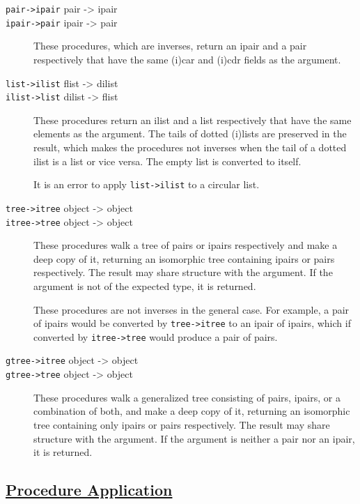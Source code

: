 \begin{description}
\item[ \href{}{} \texttt{pair-\textgreater{}ipair} pair -\textgreater{}
ipair\\
\href{}{} \texttt{ipair-\textgreater{}pair} ipair -\textgreater{} pair ]
These procedures, which are inverses, return an ipair and a pair
respectively that have the same (i)car and (i)cdr fields as the
argument.
\item[ \href{}{} \texttt{list-\textgreater{}ilist} flist -\textgreater{}
dilist\\
\href{}{} \texttt{ilist-\textgreater{}list} dilist -\textgreater{} flist
]
These procedures return an ilist and a list respectively that have the
same elements as the argument. The tails of dotted (i)lists are
preserved in the result, which makes the procedures not inverses when
the tail of a dotted ilist is a list or vice versa. The empty list is
converted to itself.

It is an error to apply \texttt{list-\textgreater{}ilist} to a circular
list.
\item[ \href{}{} \texttt{tree-\textgreater{}itree} object
-\textgreater{} object\\
\href{}{} \texttt{itree-\textgreater{}tree} object -\textgreater{}
object ]
These procedures walk a tree of pairs or ipairs respectively and make a
deep copy of it, returning an isomorphic tree containing ipairs or pairs
respectively. The result may share structure with the argument. If the
argument is not of the expected type, it is returned.

These procedures are not inverses in the general case. For example, a
pair of ipairs would be converted by \texttt{tree-\textgreater{}itree}
to an ipair of ipairs, which if converted by
\texttt{itree-\textgreater{}tree} would produce a pair of pairs.
\item[ \href{}{} \texttt{gtree-\textgreater{}itree} object
-\textgreater{} object\\
\href{}{} \texttt{gtree-\textgreater{}tree} object -\textgreater{}
object ]
These procedures walk a generalized tree consisting of pairs, ipairs, or
a combination of both, and make a deep copy of it, returning an
isomorphic tree containing only ipairs or pairs respectively. The result
may share structure with the argument. If the argument is neither a pair
nor an ipair, it is returned.
\end{description}

\subsection{\texorpdfstring{\href{}{Procedure
Application}}{Procedure Application}}\label{procedure-application}

